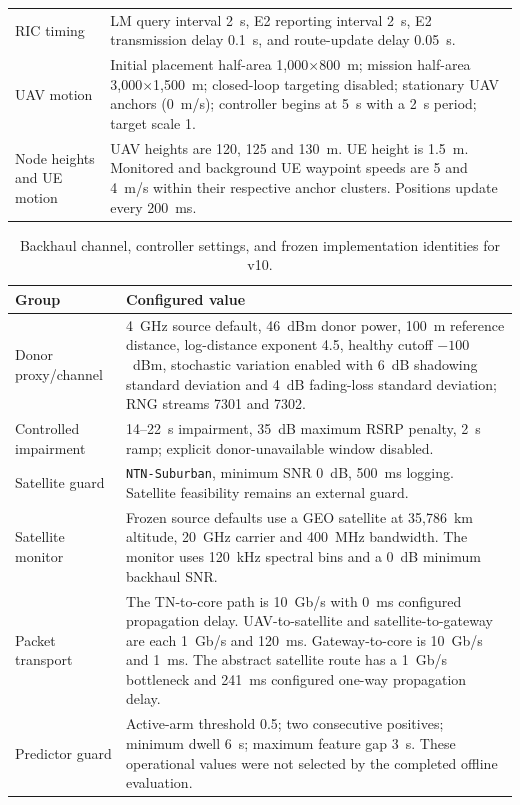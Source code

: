 \begin{table}[t]
\begin{tabular}{p{} p{}}
RIC timing & LM query interval 2~s, E2 reporting interval 2~s, E2 transmission delay 0.1~s, and route-update delay 0.05~s. \\
UAV motion & Initial placement half-area 1,000$\times$800~m; mission half-area 3,000$\times$1,500~m; closed-loop targeting disabled; stationary UAV anchors (0~m/s); controller begins at 5~s with a 2~s period; target scale 1. \\
Node heights and UE motion & UAV heights are 120, 125 and 130~m. UE height is 1.5~m. Monitored and background UE waypoint speeds are 5 and 4~m/s within their respective anchor clusters. Positions update every 200~ms. \\
\hline
\end{tabular}
\end{table}

\begin{table}[t]
\centering
\footnotesize
\caption{Backhaul channel, controller settings, and frozen implementation identities for v10.}
\label{tab:audited_backhaul_configuration}
\begin{tabular}{p{} p{}}
\hline
Group & Configured value \\
\hline
Donor proxy/channel & 4~GHz source default, 46~dBm donor power, 100~m reference distance, log-distance exponent 4.5, healthy cutoff $-100$~dBm, stochastic variation enabled with 6~dB shadowing standard deviation and 4~dB fading-loss standard deviation; RNG streams 7301 and 7302. \\
Controlled impairment & 14--22~s impairment, 35~dB maximum RSRP penalty, 2~s ramp; explicit donor-unavailable window disabled. \\
Satellite guard & \texttt{NTN-\allowbreak Suburban}, minimum SNR 0~dB, 500~ms logging.  Satellite feasibility remains an external guard. \\
Satellite monitor & Frozen source defaults use a GEO satellite at 35,786~km altitude, 20~GHz carrier and 400~MHz bandwidth. The monitor uses 120~kHz spectral bins and a 0~dB minimum backhaul SNR. \\
Packet transport & The TN-to-core path is 10~Gb/s with 0~ms configured propagation delay. UAV-to-satellite and satellite-to-gateway are each 1~Gb/s and 120~ms. Gateway-to-core is 10~Gb/s and 1~ms. The abstract satellite route has a 1~Gb/s bottleneck and 241~ms configured one-way propagation delay. \\
Predictor guard & Active-arm threshold 0.5; two consecutive positives; minimum dwell 6~s; maximum feature gap 3~s.  These operational values were not selected by the completed offline evaluation. \\

\end{tabular}
\end{table}
